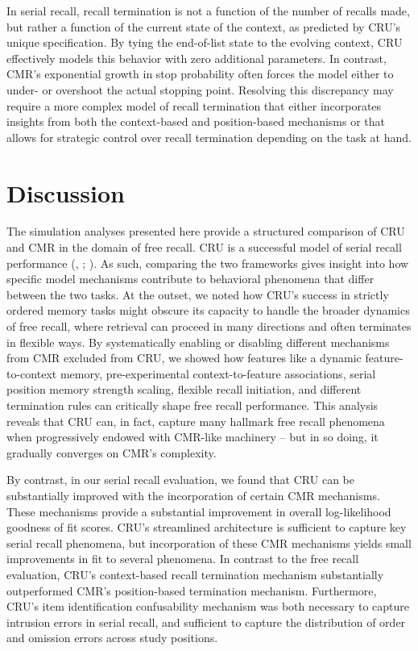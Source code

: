 \documentclass[
  man,
  floatsintext,
  longtable,
  nolmodern,
  notxfonts,
  notimes,
  draftfirst,
  colorlinks=true,linkcolor=blue,citecolor=blue,urlcolor=blue]{apa7}
\begin{document}
In serial recall, recall termination is not a function of the number of
recalls made, but rather a function of the current state of the context,
as predicted by CRU's unique specification. By tying the end-of-list
state to the evolving context, CRU effectively models this behavior with
zero additional parameters. In contrast, CMR's exponential growth in
stop probability often forces the model either to under- or overshoot
the actual stopping point. Resolving this discrepancy may require a more
complex model of recall termination that either incorporates insights
from both the context-based and position-based mechanisms or that allows
for strategic control over recall termination depending on the task at
hand.

\section{Discussion}\label{discussion}

The simulation analyses presented here provide a structured comparison
of CRU and CMR in the domain of free recall. CRU is a successful model
of serial recall performance (, ;
). As such, comparing
the two frameworks gives insight into how specific model mechanisms
contribute to behavioral phenomena that differ between the two tasks. At
the outset, we noted how CRU's success in strictly ordered memory tasks
might obscure its capacity to handle the broader dynamics of free
recall, where retrieval can proceed in many directions and often
terminates in flexible ways. By systematically enabling or disabling
different mechanisms from CMR excluded from CRU, we showed how features
like a dynamic feature-to-context memory, pre-experimental
context-to-feature associations, serial position memory strength
scaling, flexible recall initiation, and different termination rules can
critically shape free recall performance. This analysis reveals that CRU
can, in fact, capture many hallmark free recall phenomena when
progressively endowed with CMR-like machinery -- but in so doing, it
gradually converges on CMR's complexity.

By contrast, in our serial recall evaluation, we found that CRU can be
substantially improved with the incorporation of certain CMR mechanisms.
These mechanisms provide a substantial improvement in overall
log-likelihood goodness of fit scores. CRU's streamlined architecture is
sufficient to capture key serial recall phenomena, but incorporation of
these CMR mechanisms yields small improvements in fit to several
phenomena. In contrast to the free recall evaluation, CRU's
context-based recall termination mechanism substantially outperformed
CMR's position-based termination mechanism. Furthermore, CRU's item
identification confusability mechanism was both necessary to capture
intrusion errors in serial recall, and sufficient to capture the
distribution of order and omission errors across study positions.
\end{document}
